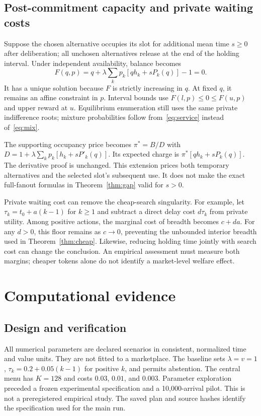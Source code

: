 \documentclass[11pt,a4paper]{article}
\begin{document}
\subsection{Post-commitment capacity and private waiting costs}\label{sec:extension}
Suppose the chosen alternative occupies its slot for additional mean time $s\geq0$ after deliberation; all unchosen alternatives release at the end of the holding interval. Under independent availability, balance becomes
\begin{equation}
 F(q,p)=q+\lambda\sum_kp_k[qh_k+sP_k(q)]-1=0.\label{eq:service}
\end{equation}
It has a unique solution because $F$ is strictly increasing in $q$. At fixed $q$, it remains an affine constraint in $p$. Interval bounds use $F(l,p)\leq0\leq F(u,p)$ and upper reward at $u$. Equilibrium enumeration still uses the same private indifference roots; mixture probabilities follow from~\eqref{eq:service} instead of~\eqref{eq:mix}.

The supporting occupancy price becomes $\pi^*=B/D$ with
$D=1+\lambda\sum_kp_k[h_k+sP'_k(q)]$. Its expected charge is
$\pi^*[qh_k+sP_k(q)]$. The derivative proof is unchanged. This extension prices both temporary alternatives and the selected slot's subsequent use. It does not make the exact full-fanout formulas in Theorem~\ref{thm:gap} valid for $s>0$.

Private waiting cost can remove the cheap-search singularity. For example, let $\tau_k=t_0+a(k-1)$ for $k\geq1$ and subtract a direct delay cost $d\tau_k$ from private utility. Among positive actions, the marginal cost of breadth becomes $c+da$. For any $d>0$, this floor remains as $c\to0$, preventing the unbounded interior breadth used in Theorem~\ref{thm:cheap}. Likewise, reducing holding time jointly with search cost can change the conclusion. An empirical assessment must measure both margins; cheaper tokens alone do not identify a market-level welfare effect.

\section{Computational evidence}\label{sec:experiments}
\subsection{Design and verification}
All numerical parameters are declared scenarios in consistent, normalized time and value units. They are not fitted to a marketplace. The baseline sets $\lambda=v=1$, $\tau_k=0.2+0.05(k-1)$ for positive $k$, and permits abstention. The central menu has $K=128$ and costs $0.03$, $0.01$, and $0.003$. Parameter exploration preceded a frozen experimental specification and a 10,000-arrival pilot. This is not a preregistered empirical study. The saved plan and source hashes identify the specification used for the main run.
\end{document}
